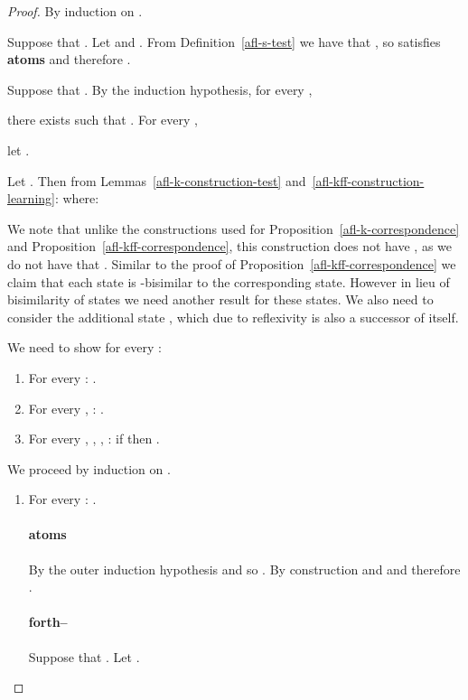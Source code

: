 \documentclass[twoside]{aiml14}
\begin{document}
  \begin{proof}
      By induction on .

      Suppose that . 
      Let  and
      . 
      From Definition~\ref{afl-s-test} we have that
      , so
       satisfies 
      {\bf atoms} and therefore 
      .

      Suppose that . 
      By the induction hypothesis, for every , 
       
      there exists  such that 
      . 
      For every , 
       
      let .
      
      Let .
      Then from Lemmas~\ref{afl-k-construction-test} and~\ref{afl-kff-construction-learning}:  where:
      

      We note that unlike the constructions used for
      Proposition~\ref{afl-k-correspondence} and
      Proposition~\ref{afl-kff-correspondence}, this construction does not have
      ,
      as we do not have that 
      .
      Similar to the proof of Proposition~\ref{afl-kff-correspondence} we claim
      that each  state is
      -bisimilar to the corresponding  state. 
      However in lieu of bisimilarity of  
      states we need another result for these states.
      We also need to consider the additional state ,
      which due to reflexivity is also a successor of itself.

      We need to show for every : 
      \begin{enumerate}
          \item For every : .
          \item For every , : .
          \item For every , , , : if  then .
      \end{enumerate}

      We proceed by induction on .

      \begin{enumerate}
          \item 
              For every : .

              \paragraph{atoms} By the outer induction hypothesis 
              and so .
              By construction  
              and  
              and therefore .

              \paragraph{forth--} Suppose that . Let . 


\end{enumerate}
\end{proof}
\end{document}
